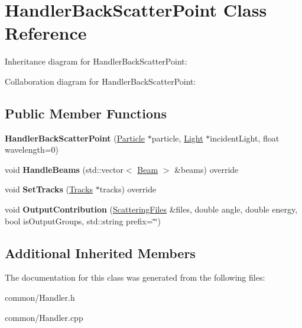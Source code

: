 \hypertarget{class_handler_back_scatter_point}{}\section{Handler\+Back\+Scatter\+Point Class Reference}
\label{class_handler_back_scatter_point}


Inheritance diagram for Handler\+Back\+Scatter\+Point\+:


Collaboration diagram for Handler\+Back\+Scatter\+Point\+:
\subsection*{Public Member Functions}
\begin{DoxyCompactItemize}
\item 
\mbox{\label{class_handler_back_scatter_point_ac1062d361d234fe7f17169cb878000dd}} 
{\bfseries Handler\+Back\+Scatter\+Point} (\mbox{\hyperlink{class_particle}{Particle}} $\ast$particle, \mbox{\hyperlink{class_light}{Light}} $\ast$incident\+Light, float wavelength=0)
\item 
\mbox{\label{class_handler_back_scatter_point_a3ce7fcb7530abbdfd8b1256d7e588536}} 
void {\bfseries Handle\+Beams} (std\+::vector$<$ \mbox{\hyperlink{class_beam}{Beam}} $>$ \&beams) override
\item 
\mbox{\label{class_handler_back_scatter_point_ac8e90fbda71ee4cde2b4ab92a9929edc}} 
void {\bfseries Set\+Tracks} (\mbox{\hyperlink{class_tracks}{Tracks}} $\ast$tracks) override
\item 
\mbox{\label{class_handler_back_scatter_point_a4316e06666856fd593118dcda1879974}} 
void {\bfseries Output\+Contribution} (\mbox{\hyperlink{class_scattering_files}{Scattering\+Files}} \&files, double angle, double energy, bool is\+Output\+Groups, std\+::string prefix=\char`\"{}\char`\"{})
\end{DoxyCompactItemize}
\subsection*{Additional Inherited Members}


The documentation for this class was generated from the following files\+:\begin{DoxyCompactItemize}
\item 
common/Handler.\+h\item 
common/Handler.\+cpp\end{DoxyCompactItemize}
